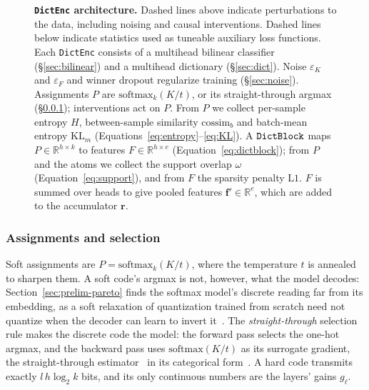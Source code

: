 \begin{figure}[tp]
\centering
\resizebox{\linewidth}{!}{}
\caption[\texttt{DictEnc} architecture]{\textbf{\texttt{DictEnc} architecture.}
	Dashed lines above indicate perturbations to the data,
	including noising and causal interventions.
	Dashed lines below indicate statistics used as tuneable auxiliary loss
	functions. Each \texttt{DictEnc} consists of a multihead bilinear
	classifier (§\ref{sec:bilinear}) and a multihead dictionary
	(§\ref{sec:dict}). Noise $\varepsilon_K$ and $\varepsilon_F$ and winner
	dropout regularize training (§\ref{sec:noise}).
	Assignments $P$ are $\mathrm{softmax}_{k}(K/t)$, or its straight-through
	argmax (§\ref{sec:labels}); interventions act on $P$. From $P$ we
	collect per-sample entropy $H$, between-sample similarity
	$\mathrm{cossim}_b$ and batch-mean entropy $\mathrm{KL}_m$
	(Equations~\ref{eq:entropy}--\ref{eq:KL}). A $\mathop{\mathtt{DictBlock}}\limits$ maps
	$P \in \mathbb{R}^{h \times k}$ to features
	$F \in \mathbb{R}^{h \times e}$ (Equation~\ref{eq:dictblock}); from $P$
	and the atoms we collect the support overlap $\omega$
	(Equation~\ref{eq:support}), and from $F$ the sparsity penalty
	$\mathrm{L1}$. $F$ is summed over heads to give pooled
	features $\mathbf{f}' \in \mathbb{R}^{e}$, which are added to the
	accumulator $\mathbf{r}$.
}
\label{fig:dictenc}
\end{figure}

\subsubsection{Assignments and selection}
\label{sec:labels}
Soft assignments are $P = \mathrm{softmax}_{k}(K/t)$, where the
temperature $t$ is annealed to sharpen them. A soft code's argmax is
not, however, what the model decodes: Section~\ref{sec:prelim-pareto}
finds the softmax model's discrete reading far from its embedding, as a
soft relaxation of quantization trained from scratch need not quantize
when the decoder can learn to invert it~\cite{vandenoord2017}. The
\emph{straight-through} selection rule makes the discrete code the model:
the forward pass selects the one-hot argmax, and the backward pass uses
$\mathrm{softmax}(K/t)$ as its surrogate gradient, the straight-through
estimator~\cite{bengio2013} in its categorical form~\cite{jang2017}. A
hard code transmits exactly $l\,h\log_2 k$ bits, and its only continuous
numbers are the layers' gains $g_\ell$.

